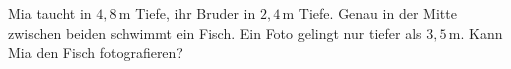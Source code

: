 \documentclass[11pt]{article}
\makeatletter
\newcommand{\aufg}[3]{\par\noindent\makebox[0pt][r]{#3}\begin{minipage}[t]{\linewidth}#1\end{minipage}\par}
\newcommand{\nr}[1]{\makebox[7mm][l]{\textbf{#1}}}
\newlength{\kr}
\newcommand{\karomerk}[2]{\protected@write\@auxout{}{\string\karoseite{#1}{#2}{\thepage}}}
\newcommand{\karoseite}[3]{\expandafter\xdef\csname karo@#1@#2\endcsname{#3}}
\makeatother
\begin{document}
\medskip
\aufg{\nr{5.}Mia taucht in $4{,}8$\,m Tiefe, ihr Bruder in $2{,}4$\,m Tiefe. Genau in der Mitte zwischen beiden schwimmt ein Fisch. Ein Foto gelingt nur tiefer als $3{,}5$\,m. Kann Mia den Fisch fotografieren?}{}{{\scriptsize\color{mbgrau}Ziel\hspace{2mm}}}
\medskip
\par\vspace{3mm}\setlength{\kr}{\dimexpr\pagegoal-\pagetotal-10mm\relax}%
\ifdim\kr>12mm\karomerk{k}{E}\noindent{\scriptsize\color{mbgrau}Platz zum Rechnen}\par\nointerlineskip\vspace{1mm}\noindent
\begin{tikzpicture}\clip (0,0) rectangle ({\linewidth-0.5mm},\kr);\draw[black!16,line width=0.3pt,step=5mm] (0,0) grid (\linewidth,\kr);\end{tikzpicture}\fi\par
\end{document}
